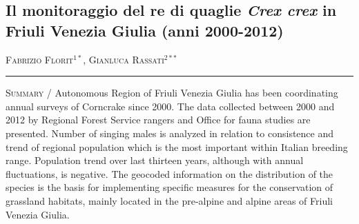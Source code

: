 \setcounter{figure}{0}
\setcounter{table}{0}

\begin{adjustwidth}{-3.5cm}{0cm}
\pagestyle{CIOpage}
\chapter*[]{\textbf{Il monitoraggio del re di quaglie }\textbf{\textit{Crex crex}}\textbf{ in Friuli Venezia Giulia (anni 2000-2012)}}

\textsc{Fabrizio Florit}$^{1*}$, \textsc{Gianluca Rassati}$^{2**}$ \\

 
\noindent\color{MUSEBLUE}\rule{27cm}{2pt}
\vspace{1cm}
\end{adjustwidth}

{\small
\noindent \textsc{\color{MUSEBLUE} Summary} / Autonomous Region of Friuli Venezia Giulia has been coordinating annual surveys of Corncrake since 2000. The data collected between 2000 and 2012 by Regional Forest Service rangers and Office for fauna studies are presented.
Number of singing males is analyzed in relation to consistence and trend of regional population which is the most
important within Italian breeding range. Population trend over last thirteen years, although with annual fluctuations, is negative. The geocoded information on the distribution of the species is the basis for implementing specific
measures for the conservation of grassland habitats, mainly located in the pre-alpine and alpine areas of Friuli
Venezia Giulia.\\
}
